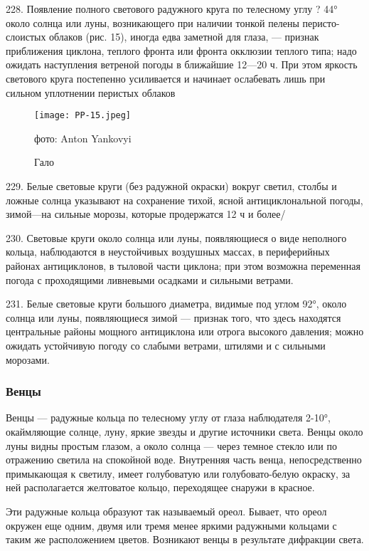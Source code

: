 228. Появление полного светового радужного круга по телесному углу ? 44° около солнца или луны, возникающего при наличии тонкой пелены перисто-слоистых облаков (рис. 15), иногда едва заметной для глаза, — признак приближения циклона, теплого фронта или фронта окклюзии теплого типа; надо ожидать наступления ветреной погоды в ближайшие 12—20 ч. При этом яркость светового круга постепенно усиливается и начинает ослабевать лишь при сильном уплотнении перистых облаков

\begin{figure}[htb]
  \centering{}
  \texttt{[image: PP-15.jpeg]}
  \caption{Гало}
  \label{fig:pp15}
  \small
  \centering{}фото: Anton Yankovyi
\end{figure}

229. Белые световые круги (без радужной окраски) вокруг светил, столбы и ложные солнца указывают на сохранение тихой, ясной антициклональной погоды, зимой—на сильные морозы, которые продержатся 12 ч и более/

230. Световые круги около солнца или луны, появляющиеся о виде неполного кольца, наблюдаются в неустойчивых воздушных массах, в периферийных районах антициклонов, в тыловой части циклона; при этом возможна переменная погода с проходящими ливневыми осадками и сильными ветрами.

231. Белые световые круги большого диаметра, видимые под углом 92°, около солнца или луны, появляющиеся зимой — признак того, что здесь находятся центральные районы мощного антициклона или отрога высокого давления; можно ожидать устойчивую погоду со слабыми ветрами, штилями и с сильными морозами.

\subsubsection{Венцы}

Венцы — радужные кольца по телесному углу от глаза наблюдателя 2-10°, окаймляющие солнце, луну, яркие звезды и другие источники света. Венцы около луны видны простым глазом, а около солнца — через темное стекло или по отражению светила на спокойной воде. Внутренняя часть венца, непосредственно примыкающая к светилу, имеет голубоватую или голубовато-белую окраску, за ней располагается желтоватое кольцо, переходящее снаружи в красное.

Эти радужные кольца образуют так называемый ореол. Бывает, что ореол окружен еще одним, двумя или тремя менее яркими радужными кольцами с таким же расположением цветов. Возникают венцы в результате дифракции света.

